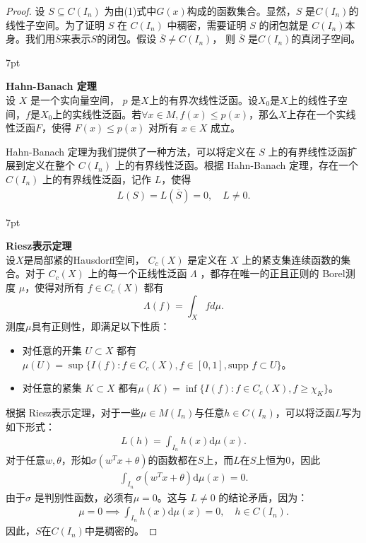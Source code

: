\documentclass[12pt]{article}
\newenvironment{formal}{%
\def\FrameCommand{%
\hspace{1pt}%
{\color{Blue}\vrule width 2pt}%
{\color{formalshade}\vrule width 4pt}%
\colorbox{formalshade}%
}%
\MakeFramed{\advance\hsize-\width\FrameRestore}%
\noindent\hspace{-4.55pt}%
\begin{adjustwidth}{}{7pt}%
\vspace{2pt}\vspace{2pt}%
}
{%
\vspace{2pt}\end{adjustwidth}\endMakeFramed%
}
\begin{document}
\begin{proof}
    设 $S \subseteq C(I_n)$ 为由(1)式中$G(x)$构成的函数集合。显然，$S$ 是$C(I_n)$的线性子空间。为了证明 $S$ 在 $C(I_n)$ 中稠密，需要证明 $S$ 的闭包就是 $C(I_n)$本身。我们用$\overline{S}$来表示$S$的闭包。假设 $\overline{S}\neq C(I_n)$， 则 $\overline{S}$ 是$C(I_n)$的真闭子空间。

\begin{formal}
\textbf{Hahn-Banach 定理}\\
设 $X$ 是一个实向量空间， $p$ 是$X$上的有界次线性泛函。设$X_0$是$X$上的线性子空间，$f$是$X_0$上的实线性泛函。若$\forall x \in M, f(x) \leq p(x)$，那么$X$上存在一个实线性泛函$F$，使得  $F(x) \leq p(x)$  对所有  $x \in X$  成立。
\end{formal}

Hahn-Banach 定理为我们提供了一种方法，可以将定义在 $S$ 上的有界线性泛函扩展到定义在整个 $C(I_n)$ 上的有界线性泛函。根据 Hahn-Banach 定理，存在一个 $C(I_n)$ 上的有界线性泛函，记作 $L$，使得
\begin{align*}
    L(S)=L(\overline{S})=0,\quad L\neq 0.
\end{align*}

\begin{formal}
\textbf{Riesz表示定理}\\
设$X$是局部紧的Hausdorff空间， $C_c(X)$ 是定义在 $X$ 上的紧支集连续函数的集合。对于 $C_c(X)$ 上的每一个正线性泛函 $\Lambda$ ，都存在唯一的正且正则的 Borel测度 $\mu$，使得对所有  $f \in C_c(X)$ 都有
$$\Lambda(f) = \int_X f d\mu.$$
测度$\mu$具有正则性，即满足以下性质：
\begin{itemize}
    \item 对任意的开集 \( U \subset X \) 都有$
    \mu(U) = \sup \{ I(f) : f \in C_c(X), f \in [0,1], \text{supp } f \subset U \}$。
    \item 对任意的紧集 \( K \subset X \) 都有$
    \mu(K) = \inf \{ I(f) : f \in C_c(X), f \geq \chi_K \}$。
\end{itemize}
\end{formal}
根据 Riesz表示定理，对于一些$\mu\in M(I_n)$与任意$h\in C(I_n)$，可以将泛函$L$写为如下形式：
\begin{align*}
    L(h)=\int_{I_n} h(x)\mathrm{d}\mu(x).
\end{align*}
对于任意$w,\theta$，形如$\sigma(w^Tx+\theta)$的函数都在$S$上，而$L$在$S$上恒为0，因此
\begin{align*}
    \int_{I_n} \sigma(w^Tx+\theta)\mathrm{d}\mu(x)=0.
\end{align*}
由于$\sigma$ 是判别性函数，必须有$\mu=0$。这与 $L\neq 0$ 的结论矛盾，因为：
\begin{align*}
    \mu=0 \implies \int_{I_n} h(x)\mathrm{d}\mu(x)=0,\quad h\in C(I_n).
\end{align*}
因此，$S$在$C(I_n)$中是稠密的。

\end{proof}
\end{document}
